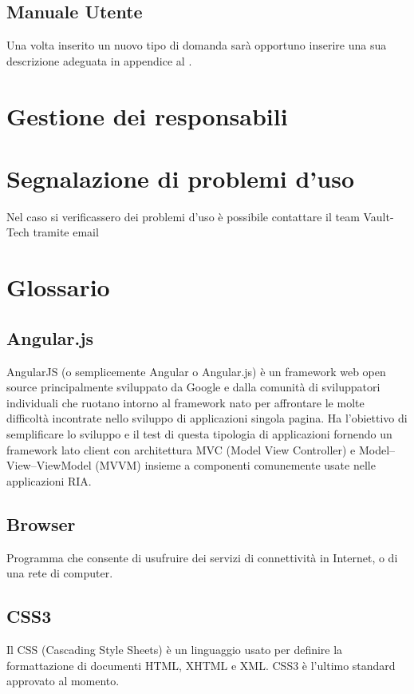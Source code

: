 \documentclass[a4paper, titlepage]{article}
\begin{document}
	\subsection{Manuale Utente}
	Una volta inserito un nuovo tipo di domanda sarà opportuno inserire una sua descrizione adeguata in appendice al .
	
	\newpage
	\section{Gestione dei responsabili}
	
	\section{Segnalazione di problemi d'uso}
	Nel caso si verificassero dei problemi d'uso è possibile contattare il team Vault-Tech tramite email 
	
	
	\newpage
	\appendix
	
	\section{Glossario}
	\label{gl} 
	
	\subsection{Angular.js}
	AngularJS (o semplicemente Angular o Angular.js) è un framework web open source principalmente sviluppato da Google e dalla comunità di sviluppatori individuali che ruotano intorno al framework nato per affrontare le molte difficoltà incontrate nello sviluppo di applicazioni singola pagina. Ha l'obiettivo di semplificare lo sviluppo e il test di questa tipologia di applicazioni fornendo un framework lato client con architettura MVC (Model View Controller) e Model–View–ViewModel (MVVM) insieme a componenti comunemente usate nelle applicazioni RIA.
	
	\subsection{Browser}
	Programma che consente di usufruire dei servizi di connettività in Internet, o di una rete di computer.
	
	\subsection{CSS3}
	Il CSS (Cascading Style Sheets) è un linguaggio usato per definire la formattazione di documenti HTML, XHTML e XML. CSS3 è l’ultimo standard approvato al momento.
	
\end{document}
